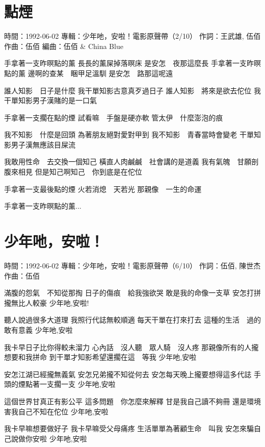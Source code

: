 \documentclass[UTF8,a4paper,oneside,twocolumn,12pt]{ctexbook}
\newcommand{\infopair}[2]{\textbullet #1：#2}
\newcommand{\zc}[1][伍佰]{\infopair{作詞}{#1}}
\newcommand{\zq}[1][伍佰]{\infopair{作曲}{#1}}
\newcommand{\bq}[1][伍佰]{\infopair{編曲}{#1}}
\newcommand{\zj}[1]{\infopair{專輯}{#1}}
\newcommand{\sj}[1]{\infopair{時間}{#1}}
\newenvironment{info}{\begin{flushleft}\kaishu
	}
	{\end{flushleft}\normalsize\yahei\par}
\newenvironment{lyric}{
	}
{}
\begin{document}
\section{點煙}
\begin{info}
	\sj{1992-06-02}
	\zj{少年吔，安啦！電影原聲帶（2/10）}
	\zc[王武雄, 伍佰]
	\zq
	\bq[伍佰 \& China Blue]
\end{info}
\begin{lyric}
	手拿著一支昨暝點的薰
	長長的薰屎掉落暝床
	是安怎　夜那這麼長
	手拿著一支昨暝點的薰
	邊啊的查某　睏甲足溫馴
	是安怎　路那這呢遠

	誰人知影　日子是什麼
	我干單知影古意真歹過日子
	誰人知影　將來是欲去佗位
	我干單知影男子漢賭的是一口氣

	手拿著一支擱在點的煙
	試看嘛　手盤是硬亦軟
	管太伊　什麼澎泡的痕

	我不知影　什麼是回頭
	為著朋友絕對愛對甲到
	我不知影　青春當時會變老
	干單知影男子漢無應該目屎流

	我敢用性命　去交換一個知己
	橫直人肉鹹鹹　社會講的是道義
	我有氣魄　甘願剖腹來相見
	但是知己啊知己　你到底是在佗位

	手拿著一支最後點的煙
	火若消熄　天若光
	那親像　一生的命運

	手拿著一支昨暝點的薰...
\end{lyric}

\section{少年吔，安啦！}
\begin{info}
	\sj{1992-06-02}
	\zj{少年吔，安啦！電影原聲帶（6/10）}
	\zc[伍佰, 陳世杰]
	\zq
\end{info}
\begin{lyric}
	滿腹的怨氣　不知從那掏
	日子的傷痕　給我強欲哭
	敢是我的命像一支草
	安怎打拼攏無比人較豪
	少年吔,安啦!

	聽人說過很多大道理
	我照行代誌無較順適
	每天干單在打來打去
	這種的生活　過的敢有意義
	少年吔,安啦

	我卡早日子比你得較未溜力
	心內話　沒人聽　眾人騎　沒人疼
	那親像所有的人攏想要和我拼命
	到干單才知影希望還擱在這　等我
	少年吔,安啦

	安怎江湖已經攏無義氣
	安怎兄弟攏不知從何去
	安怎每天晚上攏要想得這多代誌
	手頭的煙點著一支擱一支
	少年吔,安啦

	這個世界甘真正有影公平
	這多問題　你怎麼來解釋
	甘是我自己讀不夠冊
	還是環境害我自己不知在佗位
	少年吔,安啦

	我卡早嘛想要做好子
	我卡早嘛受父母痛疼
	生活單單為著顧生命　叫我
	安怎來騙自己說做你安啦
	少年吔,安啦
\end{lyric}
\end{document}
